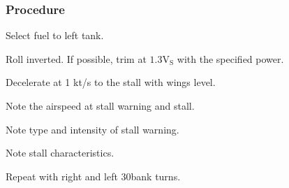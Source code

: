 % 
% 
%
 \subsubsection*{Procedure}
 \begin{compactenum}
   \item Select fuel to left tank.
   \item Roll inverted.  If possible, trim at $\mathrm{1.3V_{S}}$ with the specified power.
   \item Decelerate at 1 kt/s to the stall with wings level.
   \item Note the airspeed at stall warning and stall.
   \item Note type and intensity of stall warning.
   \item Note stall characteristics.
   \item Repeat with right and left 30\textdegree bank turns.
   \end{compactenum}